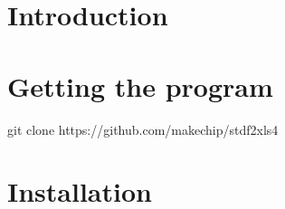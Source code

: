 \documentclass[letterpaper]{article}
\begin{document}
\selectfont
\newcommand{\tfont}{\usefont{T1}{ua1}{m}{n}\selectfont\footnotesize}
\newcommand{\bfont}{\usefont{T1}{ua1}{b}{n}\selectfont\tiny}
\newcommand{\xfont}{\usefont{T1}{ua1}{m}{n}\selectfont\scriptsize}
\newcommand{\lfont}{\usefont{T1}{ua1}{m}{n}\selectfont\large}
\newcommand{\device}{ADC0801}
\renewcommand{\captionfont}{\it }
\newcommand{\dsname}{Test Program}
\renewcommand{\date}{December 12, 2014}
\newcommand{\ver}{V1.0}
\renewcommand{\partnum}{ADC0801}
\newcommand{\tablecap}{\hline\end{tabular}\end{table}\end{center}}
\renewcommand{\customer}{Micross Components}
\renewcommand{\versionhistory}{
\vspace*{1in}
\begin{center}
\begin{table}[H]\caption*{Revision History}
\centering
\xfont\begin{tabular}[H]{|c|c|c|c|}
\hline
{\bf Version} & {\bf Author} & {\bf Date} & {\bf Changes}\\
\hline
\hline
1.0 & Eric West & 12/12/14 & Initial version \\
\hline
\end{tabular}
\end{table}
\end{center}
}
\maketitle
\setcounter{tocdepth}{2}
\tableofcontents
\clearpage
\makebg

\section{Introduction}


\section{Getting the program}
git clone https://github.com/makechip/stdf2xls4

\section{Installation}
\end{document}
